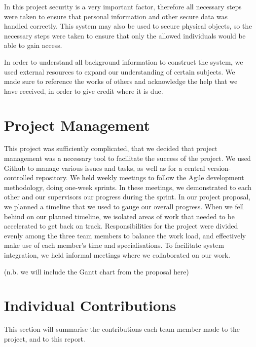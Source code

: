 \documentclass[12pt]{report}
\let\Oldsection\section
\renewcommand{\section}{\FloatBarrier\Oldsection}
\begin{document}
In this project security is a very important factor, therefore all necessary steps were taken to ensure that personal
information and other secure data was handled correctly. This system may also be used to secure physical objects,
so the necessary steps were taken to ensure that only the allowed individuals would be able to gain access.

In order to understand all background information to construct the system, we used external resources to expand our
understanding of certain subjects. We made sure to reference the works of others and acknowledge the help that
we have received, in order to give credit where it is due.


\section{Project Management} \label{project-management}

This project was sufficiently complicated, that we decided that project management was a necessary tool to facilitate 
the success of the project. We used Github to manage various issues and tasks, as well as for a central 
version-controlled repository. We held weekly meetings to follow the Agile development methodology, doing one-week 
sprints. In these meetings, we demonstrated to each other and our supervisors our progress during the sprint. In our 
project proposal, we planned a timeline that we used to gauge our overall progress. When we fell behind on our planned 
timeline, we isolated areas of work that needed to be accelerated to get back on track. Responsibilities for the 
project were divided evenly among the three team members to balance the work load, and effectively make use of each 
member's time and specialisations. To facilitate system integration, we held informal meetings where we collaborated on 
our work.

(n.b. we will include the Gantt chart from the proposal here)


\section{Individual Contributions} \label{individual-contributions}

This section will summarise the contributions each team member made to the project, and to this report.
\end{document}
